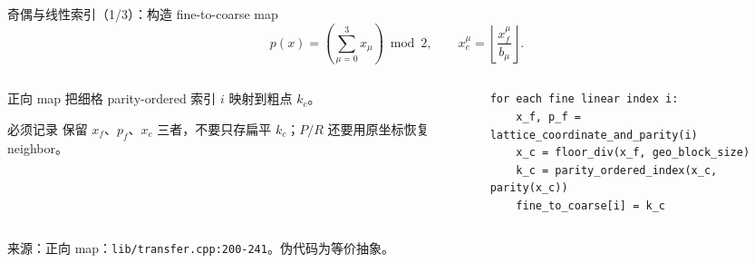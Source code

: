 \documentclass[UTF8,aspectratio=169,11pt]{ctexbeamer}
\newcommand{\source}[1]{\vspace{0.05em}\par{\raggedright\scriptsize\color{muted}来源：#1\par}}
\newcommand{\codepath}[1]{\nolinkurl{#1}}
\begin{document}
\begin{frame}[fragile,t]{奇偶与线性索引（1/3）：构造 fine-to-coarse map}
  \begin{equation*}
    p(x)=\left(\sum_{\mu=0}^{3}x_\mu\right)\bmod 2,
    \qquad x_c^\mu=\left\lfloor\frac{x_f^\mu}{b_\mu}\right\rfloor.
  \end{equation*}
  \begin{columns}[T,totalwidth=\textwidth]
    \begin{column}{0.39\textwidth}
      \begin{block}{正向 map}
        \texttt{} 把细格 parity-ordered 索引 \(i\) 映射到粗点 \(k_c\)。
      \end{block}
      \begin{alertblock}{必须记录}
        保留 \(x_f\)、\(p_f\)、\(x_c\) 三者，不要只存扁平 \(k_c\)；\(P/R\) 还要用原坐标恢复 neighbor。
      \end{alertblock}
    \end{column}
    \begin{column}{0.57\textwidth}
  \begin{lstlisting}[firstnumber=1]
for each fine linear index i:
    x_f, p_f = lattice_coordinate_and_parity(i)
    x_c = floor_div(x_f, geo_block_size)
    k_c = parity_ordered_index(x_c, parity(x_c))
    fine_to_coarse[i] = k_c
  \end{lstlisting}
    \end{column}
  \end{columns}
  \source{正向 map：\codepath{lib/transfer.cpp:200-241}。伪代码为等价抽象。}
\end{frame}
\end{document}
